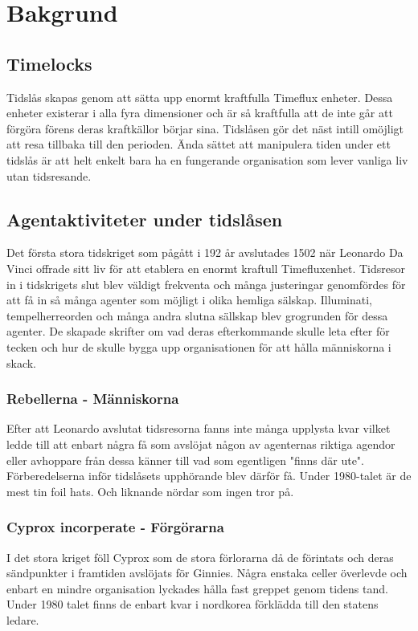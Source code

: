 \documentclass[a5paper,10pt]{report}
\begin{document}
\maketitle
%

\clearpage
\chapter{Bakgrund}
\section{Timelocks}
Tidslås skapas genom att sätta upp enormt kraftfulla Timeflux enheter. Dessa enheter existerar i alla fyra dimensioner och är så kraftfulla att de inte går att förgöra förens deras kraftkällor börjar sina. Tidslåsen gör det näst intill omöjligt att resa tillbaka till den perioden. Ända sättet att manipulera tiden under ett tidslås är att helt enkelt bara ha en fungerande organisation som lever vanliga liv utan tidsresande.
\section{Agentaktiviteter under tidslåsen}
Det första stora tidskriget som pågått i 192 år avslutades 1502 när Leonardo Da Vinci offrade sitt liv för att etablera en enormt kraftull Timefluxenhet. Tidsresor in i tidskrigets slut blev väldigt frekventa och många justeringar genomfördes för att få in så många agenter som möjligt i olika hemliga sälskap. Illuminati, tempelherreorden och många andra slutna sällskap blev grogrunden för dessa agenter. De skapade skrifter om vad deras efterkommande skulle leta efter för tecken och hur de skulle bygga upp organisationen för att hålla människorna i skack.
\subsection{Rebellerna - Människorna}
Efter att Leonardo avslutat tidsresorna fanns inte många upplysta kvar vilket ledde till att enbart några få som avslöjat någon av agenternas riktiga agendor eller avhoppare från dessa känner till vad som egentligen "finns där ute". Förberedelserna inför tidslåsets upphörande blev därför få. Under 1980-talet är de mest tin foil hats. Och liknande nördar som ingen tror på.
\subsection{Cyprox incorperate - Förgörarna}
I det stora kriget föll Cyprox som de stora förlorarna då de förintats och deras sändpunkter i framtiden avslöjats för Ginnies. Några enstaka celler överlevde och enbart en mindre organisation lyckades hålla fast greppet genom tidens tand. Under 1980 talet finns de enbart kvar i nordkorea förklädda till den statens ledare.
\end{document}
